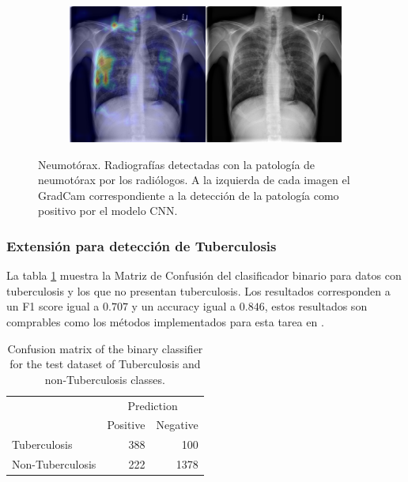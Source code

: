 \begin{figure}[b]
\begin{subfigure}{0.4\textwidth}
    \end{subfigure}
    \begin{subfigure}{0.4\textwidth}
        \centering
        \includegraphics[width=1.0\textwidth]{Chapters/5. Conclusiones/img/Pneumothorax/1_1_00001006_021.png}
    \end{subfigure}

    \caption[short]{Neumotórax. Radiografías detectadas con la patología de neumotórax por los
                    radiólogos. A la izquierda de cada imagen el GradCam correspondiente a la detección
                    de la patología como positivo por el modelo CNN.}
    \label{fig-ntorx}
\end{figure}


\subsubsection{Extensión para detección de Tuberculosis}

La tabla \ref{table_tb1} muestra la Matriz de Confusión del clasificador binario para datos con
tuberculosis y los que no presentan tuberculosis. Los resultados corresponden a un F1 score igual a
$0.707$ y un accuracy igual a $0.846$, estos resultados son comprables como los métodos implementados
para esta tarea en \cite{puttagunta2021detection}.

\begin{table}[b]
    \centering
    \begin{tabular}{lcr}
                                          & \multicolumn{2}{c}{Prediction}                                \\ \cline{2-3}
    \multicolumn{1}{l|}{}                 & \multicolumn{1}{c|}{Positive} & \multicolumn{1}{c|}{Negative} \\ \hline
    \multicolumn{1}{|l|}{Tuberculosis}    & \multicolumn{1}{r|}{388}      & \multicolumn{1}{r|}{100}      \\ \hline
    \multicolumn{1}{|l|}{Non-Tuberculosis} & \multicolumn{1}{r|}{222}      & \multicolumn{1}{r|}{1378}     \\ \hline
    \end{tabular}
    \caption{Confusion matrix of the binary classifier for the test dataset of Tuberculosis and non-Tuberculosis classes.}
    \label{table_tb1}
\end{table}
